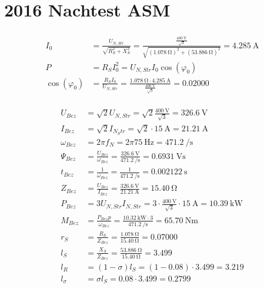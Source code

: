 \documentclass[11pt,a4paper]{scrartcl}
\newcommand{\mybr}[1]{\left(#1\right)}
\newcommand{\0}{_{\mybr{0}}}
\newcommand{\1}{_{\mybr{1}}}
\newcommand{\2}{_{\mybr{2}}}
\begin{document}
\part{2016 Nachtest ASM}
\section{}
\subsection{}
\begin{align}
	I_0&=\frac{U_{N,Str}}{\sqrt{R_S^2+X_S^2}}=\frac{\frac{\SI{400}{\volt}}{\sqrt{3}}}{\sqrt{\mybr{\SI{1.078}{\ohm}}^2+\mybr{\SI{53.886}{\ohm}}^2}}=\SI{4.285}{\ampere}\\
	P&=R_S I_0^2=U_{N,Str}I_0\cos\mybr{\varphi_0}\\
	\cos\mybr{\varphi_0}&=\frac{R_S I_0}{U_{N,Str}}=\frac{\SI{1.078}{\ohm}\cdot \SI{4.285}{\ampere}}{\frac{\SI{400}{\volt}}{\sqrt{3}}}=\num{0.02000}
\end{align}

\subsection{}
\begin{align}
	U_{Bez}&=\sqrt{2}U_{N,Str}=\sqrt{2}\frac{\SI{400}{\volt}}{\sqrt{3}}=\SI{326.6}{\volt}\\
	I_{Bez}&=\sqrt{2}I_{N_Str}=\sqrt{2}\cdot\SI{15}\ampere=\SI{21.21}{\ampere}\\
	\omega_{Bez}&=2\pi f_N=2 \pi \SI{75}{\hertz}=\SI{471.2}{\per\second}\\
	\Psi_{Bez}&=\frac{U_{Bez}}{\omega_{Bez}}=\frac{\SI{326.6}{\volt}}{\SI{471.2}{\per\second}}=\SI{0.6931}{\volt\second}\\
	t_{Bez}&=\frac{1}{\omega_{Bez}}=\frac{1}{\SI{471.2}{\per\second}}=\SI{0.002122}{\second}\\
	Z_{Bez}&=\frac{U_{Bez}}{I_{Bez}}=\frac{\SI{326.6}{\volt}}{\SI{21.21}{\ampere}}=\SI{15.40}{\ohm}\\
	P_{Bez}&=3U_{N,Str}I_{N,Str}=3\cdot\frac{\SI{400}{\volt}}{\sqrt{3}}\cdot\SI{15}{\ampere}=\SI{10.39}{\kilo\watt}\\
	M_{Bez}&=\frac{P_{Bez}p}{\omega_{Bez}}=\frac{\SI{10.32}{\kilo\watt}\cdot 3}{\SI{471.2}{\per\second}}=\SI{65.70}{\newton\metre}\\
	r_S&=\frac{R_S}{Z_{Bez}}=\frac{\SI{1.078}{\ohm}}{\SI{15.40}{\ohm}}=\num{0.07000}\\
	l_S&=\frac{X_S}{Z_{Bez}}=\frac{\SI{53.886}{\ohm}}{\SI{15.40}{\ohm}}=\num{3.499}\\
	l_R&=\mybr{1-\sigma}l_S=\mybr{1-\num{0.08}}\cdot\num{3.499}=\num{3.219}\\
	l_\sigma&=\sigma l_S=\num{0.08}\cdot\num{3.499}=\num{0.2799}
\end{align}
\end{document}
